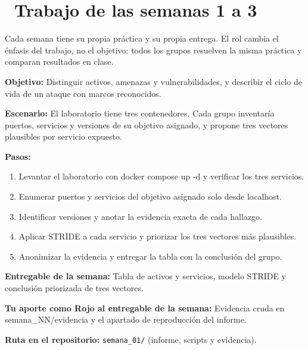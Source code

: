 \documentclass[11pt,a4paper]{article}
\newcommand{\iconotexto}[2]{\textcolor{cyanNeon}{\faIcon{#1}}~#2}
\begin{document}
\section{\iconotexto{calendar-alt}{Trabajo de las semanas 1 a 3}}

Cada semana tiene su propia práctica y su propia entrega. El rol cambia el énfasis del trabajo, no el objetivo: todos los grupos resuelven la misma práctica y comparan resultados en clase.

\begin{tcolorbox}[cajaContenido,title={Semana 1 --- Inventario de superficie de ataque del laboratorio}]
\textbf{Objetivo:} Distinguir activos, amenazas y vulnerabilidades, y describir el ciclo de vida de un ataque con marcos reconocidos.

\textbf{Escenario:} El laboratorio tiene tres contenedores. Cada grupo inventaría puertos, servicios y versiones de su objetivo asignado, y propone tres vectores plausibles por servicio expuesto.


\textbf{Pasos:}
\begin{enumerate}[leftmargin=1.4em,itemsep=2pt,topsep=3pt]
  \item Levantar el laboratorio con docker compose up -d y verificar los tres servicios.
  \item Enumerar puertos y servicios del objetivo asignado solo desde localhost.
  \item Identificar versiones y anotar la evidencia exacta de cada hallazgo.
  \item Aplicar STRIDE a cada servicio y priorizar los tres vectores más plausibles.
  \item Anonimizar la evidencia y entregar la tabla con la conclusión del grupo.
\end{enumerate}
\textbf{Entregable de la semana:} Tabla de activos y servicios, modelo STRIDE y conclusión priorizada de tres vectores.

\textbf{Tu aporte como Rojo al entregable de la semana:} Evidencia cruda en semana\_NN/evidencia y el apartado de reproducción del informe.

\textbf{Ruta en el repositorio:} \texttt{semana\_01/} (informe, scripts y evidencia).
\end{tcolorbox}
\end{document}
